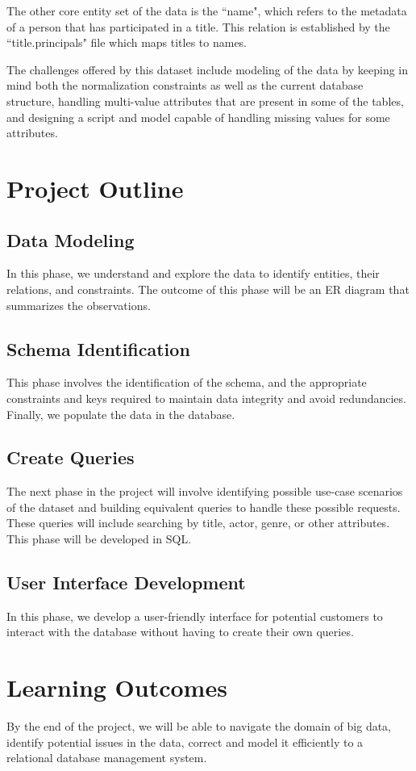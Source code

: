 \documentclass{sig-alternate}
\begin{document}
The other core entity set of the data is the ``name", which refers to the metadata of a person that has participated in a title. This relation is established by the ``title.principals" file which maps titles to names.

The challenges offered by this dataset include modeling of the data by keeping in mind both the normalization constraints as well as the current database structure, handling multi-value attributes that are present in some of the tables, and designing a script and model capable of handling missing values for some attributes.
\section{Project Outline}
\subsection{Data Modeling}
In this phase, we understand and explore the data to identify entities, their relations, and constraints. The outcome of this phase will be an  ER diagram that summarizes the observations.
\subsection{Schema Identification}
This phase involves the identification of the schema, and the appropriate constraints and keys required to maintain data integrity and avoid redundancies. Finally, we populate the data in the database.
\subsection{Create Queries}
The next phase in the project will involve identifying possible use-case scenarios of the dataset and building equivalent queries to handle these possible requests. These queries will include searching by title, actor, genre, or other attributes. This phase will be developed in SQL. 
\subsection{User Interface Development}
In this phase, we develop a user-friendly interface for potential customers to interact with the database without having to create their own queries. 
\section{Learning Outcomes}
By the end of the project, we will be able to navigate the domain of big data, identify potential issues in the data, correct and model it efficiently to a relational database management system. 
\end{document}
